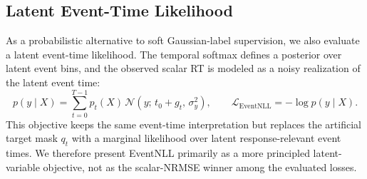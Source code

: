 \documentclass[12pt]{article}
\begin{document}
\begin{table}[!t]
\centering
\caption{Five-seed robustness summary for selected core models. Values are mean $\pm$ sample standard deviation over seeds 2025--2029; R11 range is min--max across seeds. Posterior scores are reported only for event-time segmentation runs. Lower is better for all metrics.}
\label{tab:seed_robustness}
\scriptsize
\setlength{\tabcolsep}{3pt}
\renewcommand{\arraystretch}{1.12}
\end{table}

\subsection{Latent Event-Time Likelihood}
\label{sec:event_nll}

As a probabilistic alternative to soft Gaussian-label supervision, we also evaluate a latent event-time likelihood. The temporal softmax defines a posterior over latent event bins, and the observed scalar RT is modeled as a noisy realization of the latent event time:
\begin{equation}
\label{eq:event_nll}
p(y\mid X)
= \sum_{t=0}^{T-1} p_t(X)\,
\mathcal{N}\!\left(y;\,t_0 + g_t,\,\sigma_y^2\right),
\qquad
\mathcal{L}_{\mathrm{EventNLL}} = -\log p(y\mid X).
\end{equation}
This objective keeps the same event-time interpretation but replaces the artificial target mask $q_t$ with a marginal likelihood over latent response-relevant event times. We therefore present EventNLL primarily as a more principled latent-variable objective, not as the scalar-NRMSE winner among the evaluated losses.
\end{document}
